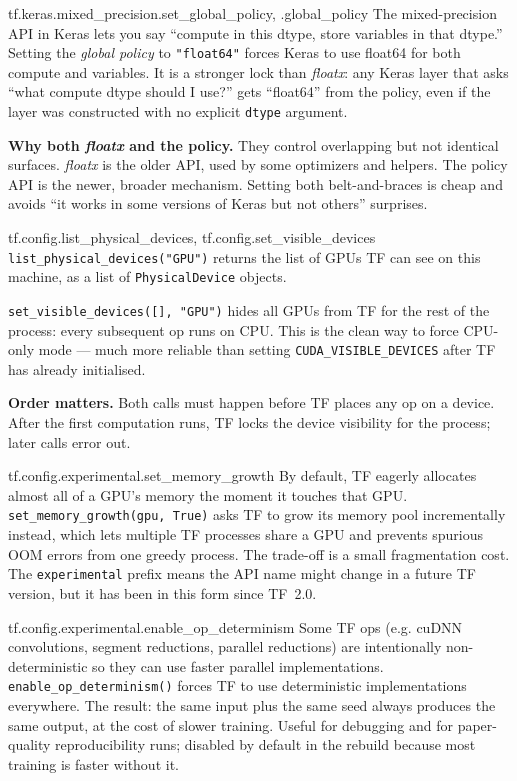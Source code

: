 \documentclass[11pt]{report}
\begin{document}
\begin{tfcmd}{tf.keras.mixed\_precision.set\_global\_policy, .global\_policy}
The mixed-precision API in Keras lets you say ``compute in this dtype,
store variables in that dtype.'' Setting the \emph{global policy} to
\texttt{"float64"} forces Keras to use float64 for both compute and
variables. It is a stronger lock than \emph{floatx}: any Keras layer
that asks ``what compute dtype should I use?'' gets ``float64'' from
the policy, even if the layer was constructed with no explicit
\texttt{dtype} argument.

\textbf{Why both \emph{floatx} and the policy.} They control overlapping
but not identical surfaces. \emph{floatx} is the older API, used by
some optimizers and helpers. The policy API is the newer, broader
mechanism. Setting both belt-and-braces is cheap and avoids ``it works
in some versions of Keras but not others'' surprises.
\end{tfcmd}

\begin{tfcmd}{tf.config.list\_physical\_devices, tf.config.set\_visible\_devices}
\texttt{list\_physical\_devices("GPU")} returns the list of GPUs TF can
see on this machine, as a list of \texttt{PhysicalDevice} objects.

\texttt{set\_visible\_devices([], "GPU")} hides all GPUs from TF for
the rest of the process: every subsequent op runs on CPU. This is the
clean way to force CPU-only mode --- much more reliable than setting
\texttt{CUDA\_VISIBLE\_DEVICES} after TF has already initialised.

\textbf{Order matters.} Both calls must happen before TF places any op
on a device. After the first computation runs, TF locks the device
visibility for the process; later calls error out.
\end{tfcmd}

\begin{tfcmd}{tf.config.experimental.set\_memory\_growth}
By default, TF eagerly allocates almost all of a GPU's memory the
moment it touches that GPU. \texttt{set\_memory\_growth(gpu, True)}
asks TF to grow its memory pool incrementally instead, which lets
multiple TF processes share a GPU and prevents spurious OOM errors
from one greedy process. The trade-off is a small fragmentation cost.
The \texttt{experimental} prefix means the API name might change in a
future TF version, but it has been in this form since TF~2.0.
\end{tfcmd}

\begin{tfcmd}{tf.config.experimental.enable\_op\_determinism}
Some TF ops (e.g. cuDNN convolutions, segment reductions, parallel
reductions) are intentionally non-deterministic so they can use faster
parallel implementations. \texttt{enable\_op\_determinism()} forces TF
to use deterministic implementations everywhere. The result: the same
input plus the same seed always produces the same output, at the cost
of slower training. Useful for debugging and for paper-quality
reproducibility runs; disabled by default in the rebuild because most
training is faster without it.
\end{tfcmd}
\end{document}
